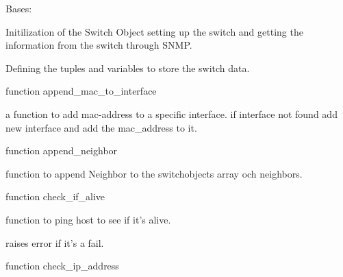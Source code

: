 \documentclass[letterpaper,10pt,english]{sphinxmanual}
\begin{document}
\begin{fulllineitems}
\label{Switch_Object:Switch_Object.Sw_Object}
Bases: 

Initilization of the Switch Object setting up the switch and
getting the information from the switch through SNMP.

Defining the tuples and variables to store the switch data.

\begin{fulllineitems}
\label{Switch_Object:Switch_Object.Sw_Object.append_mac_to_interface}
function append\_mac\_to\_interface

a function to add mac-address to a specific interface. if interface not found add new interface and add the mac\_address to it.

\end{fulllineitems}


\begin{fulllineitems}
\label{Switch_Object:Switch_Object.Sw_Object.append_neighbor}
function append\_neighbor

function to append Neighbor to the switchobjects array och neighbors.

\end{fulllineitems}


\begin{fulllineitems}
\label{Switch_Object:Switch_Object.Sw_Object.check_if_alive}
function check\_if\_alive

function to ping host to see if it's alive.

raises error if it's a fail.

\end{fulllineitems}


\begin{fulllineitems}
\label{Switch_Object:Switch_Object.Sw_Object.check_ip_address}
function check\_ip\_address


\end{fulllineitems}
\end{fulllineitems}
\end{document}
